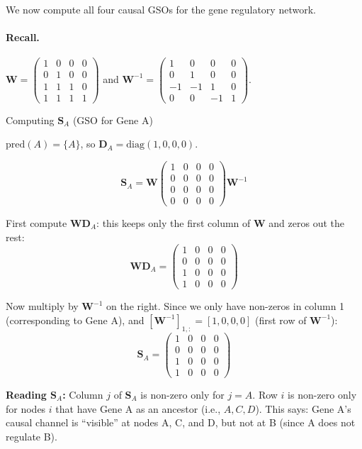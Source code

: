 We now compute all four causal GSOs for the gene regulatory network.

\paragraph{Recall.} $\mathbf{W} = \begin{pmatrix}1&0&0&0\\0&1&0&0\\1&1&1&0\\1&1&1&1\end{pmatrix}$
and $\mathbf{W}^{-1} = \begin{pmatrix}1&0&0&0\\0&1&0&0\\-1&-1&1&0\\0&0&-1&1\end{pmatrix}$.

\begin{examplebox}{Computing $\mathbf{S}_A$ (GSO for Gene A)}

$\text{pred}(A) = \{A\}$, so $\mathbf{D}_A = \text{diag}(1, 0, 0, 0)$.

\[
    \mathbf{S}_A = \mathbf{W} \begin{pmatrix}1&0&0&0\\0&0&0&0\\0&0&0&0\\0&0&0&0\end{pmatrix} \mathbf{W}^{-1}
\]

First compute $\mathbf{W}\mathbf{D}_A$: this keeps only the first column of
$\mathbf{W}$ and zeros out the rest:
\[
    \mathbf{W}\mathbf{D}_A = \begin{pmatrix}1&0&0&0\\0&0&0&0\\1&0&0&0\\1&0&0&0\end{pmatrix}
\]

Now multiply by $\mathbf{W}^{-1}$ on the right. Since we only have non-zeros in
column 1 (corresponding to Gene A), and $[\mathbf{W}^{-1}]_{1,:} = [1,0,0,0]$
(first row of $\mathbf{W}^{-1}$):
\[
    \mathbf{S}_A = \begin{pmatrix}1&0&0&0\\0&0&0&0\\1&0&0&0\\1&0&0&0\end{pmatrix}
\]

\textbf{Reading $\mathbf{S}_A$:} Column $j$ of $\mathbf{S}_A$ is non-zero only
for $j = A$. Row $i$ is non-zero only for nodes $i$ that have Gene A as an
ancestor (i.e., $A, C, D$). This says: Gene A's causal channel is ``visible''
at nodes A, C, and D, but not at B (since A does not regulate B).
\end{examplebox}

